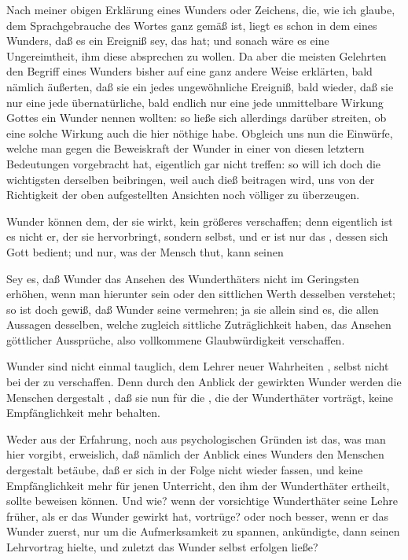 Nach meiner obigen Erklärung eines Wunders oder Zeichens, die, wie ich glaube, dem Sprachgebrauche des Wortes ganz gemäß ist, liegt es schon in dem  eines Wunders, daß es ein Ereigniß sey, das  hat; und sonach wäre es eine Ungereimtheit, ihm diese absprechen zu wollen. Da aber die meisten Gelehrten den Begriff eines Wunders bisher auf eine ganz andere Weise erklärten, bald nämlich äußerten, daß sie ein jedes ungewöhnliche Ereigniß, bald wieder, daß sie nur eine jede übernatürliche, bald endlich nur eine jede unmittelbare Wirkung Gottes ein Wunder nennen wollten: so ließe sich allerdings darüber streiten, ob eine solche Wirkung auch die hier nöthige  habe. Obgleich uns nun die Einwürfe, welche man gegen die Beweiskraft der Wunder in einer von diesen letztern Bedeutungen vorgebracht hat, eigentlich gar nicht treffen: so will ich doch die wichtigsten derselben beibringen, weil auch dieß beitragen wird, uns von der Richtigkeit der oben aufgestellten Ansichten noch völliger zu überzeugen.\par
{} Wunder können dem, der sie wirkt, kein größeres  verschaffen; denn eigentlich ist es nicht er, der sie hervorbringt, sondern  selbst, und er ist nur das , dessen sich Gott bedient; und nur, was der Mensch  thut, kann seinen \par
{} Sey es, daß Wunder das Ansehen des Wunderthäters nicht im Geringsten erhöhen, wenn man hierunter sein  oder den sittlichen Werth desselben verstehet; so ist doch gewiß, daß Wunder seine  vermehren; ja sie allein sind es, die allen Aussagen desselben, welche zugleich sittliche Zuträglichkeit haben, das Ansehen göttlicher Aussprüche, also vollkommene Glaubwürdigkeit verschaffen.~\par
{} Wunder sind nicht einmal tauglich, dem Lehrer neuer Wahrheiten , selbst nicht bei der  zu verschaffen. Denn durch den Anblick der gewirkten Wunder werden die Menschen dergestalt , daß sie nun für die , die der Wunderthäter vorträgt, keine Empfänglichkeit mehr behalten.\par
{} Weder aus der Erfahrung, noch aus psychologischen Gründen ist das, was man hier vorgibt, erweislich, daß nämlich der Anblick eines Wunders den Menschen dergestalt betäube, daß er sich in der Folge nicht wieder fassen, und keine Empfänglichkeit mehr für jenen Unterricht, den ihm der Wunderthäter ertheilt, sollte beweisen können. Und wie? wenn der vorsichtige Wunderthäter seine Lehre früher, als er das Wunder gewirkt hat, vortrüge? oder noch besser, wenn er das Wunder zuerst, nur um die Aufmerksamkeit zu spannen, ankündigte, dann seinen Lehrvortrag hielte, und zuletzt das Wunder selbst erfolgen ließe?\par
